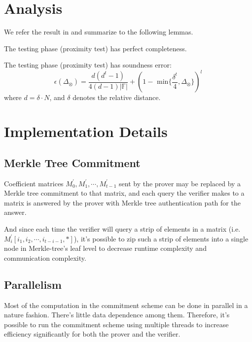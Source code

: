 \section{Analysis}

We refer the result in \cite{cryptoeprint:2020/1426} and summarize to the following lemmas. 

\begin{lemma}
\label{lemma:pc-completeness}
The testing phase (proximity test) has perfect completeness.
\end{lemma}

\begin{lemma}
\label{lemma:pc-soundness}
The testing phase (proximity test) has soundness error:
$$
    \epsilon(\Delta_\otimes) = \frac{d(d^t-1)}{4(d-1)|\mathbb{F}|} + (1 - \text{ min}\{\frac{\delta^t}{4}, \Delta_\otimes \})^l
$$
where $d = \delta \cdot N$, and $\delta$ denotes the relative distance.
\end{lemma}



\section{Implementation Details}

\subsection{Merkle Tree Commitment}

Coefficient matrices $M_0^\prime, M_1^\prime, \cdots, M_{t-1}^\prime$ sent by the prover may be replaced by a Merkle tree commitment to that matrix, and each query the verifier makes to a matrix is answered by the prover with Merkle tree authentication path for the answer.

And since each time the verifier will query a strip of elements in a matrix (i.e. $M_i^\prime[i_1, i_2, \cdots, i_{t-i-1}, *]$), it's possible to zip such a strip of elements into a single node in Merkle-tree's leaf level to decrease runtime complexity and communication complexity.

\subsection{Parallelism}

Most of the computation in the commitment scheme can be done in parallel in a nature fashion. There's little data dependence among them. Therefore, it's possible to run the commitment scheme using multiple threads to increase efficiency significantly for both the prover and the verifier.


